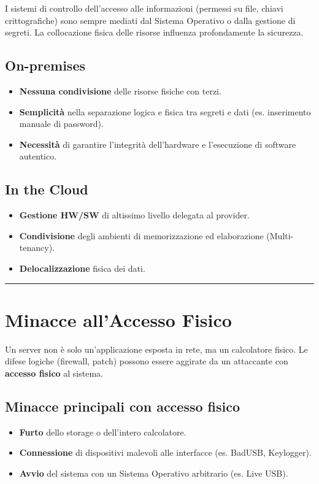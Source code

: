 \documentclass[12pt, a4paper]{report}
\begin{document}
I sistemi di controllo dell'accesso alle informazioni (permessi su file, chiavi crittografiche) sono sempre mediati dal Sistema Operativo o dalla gestione di segreti. La collocazione fisica delle risorse influenza profondamente la sicurezza.

\subsection{On-premises}
\begin{itemize}
	\item \textbf{Nessuna condivisione} delle risorse fisiche con terzi.
	\item \textbf{Semplicità} nella separazione logica e fisica tra segreti e dati (es. inserimento manuale di password).
	\item \textbf{Necessità} di garantire l'integrità dell'hardware e l'esecuzione di software autentico.
\end{itemize}

\subsection{In the Cloud}
\begin{itemize}
	\item \textbf{Gestione HW/SW} di altissimo livello delegata al provider.
	\item \textbf{Condivisione} degli ambienti di memorizzazione ed elaborazione (Multi-tenancy).
	\item \textbf{Delocalizzazione} fisica dei dati.
\end{itemize}

\noindent\rule{\textwidth}{0.4pt}

\section{Minacce all'Accesso Fisico}

Un server non è solo un'applicazione esposta in rete, ma un calcolatore fisico. Le difese logiche (firewall, patch) possono essere aggirate da un attaccante con \textbf{accesso fisico} al sistema.

\subsection{Minacce principali con accesso fisico}
\begin{itemize}
	\item \textbf{Furto} dello storage o dell'intero calcolatore.
	\item \textbf{Connessione} di dispositivi malevoli alle interfacce (es. BadUSB, Keylogger).
	\item \textbf{Avvio} del sistema con un Sistema Operativo arbitrario (es. Live USB).
\end{itemize}
\end{document}
